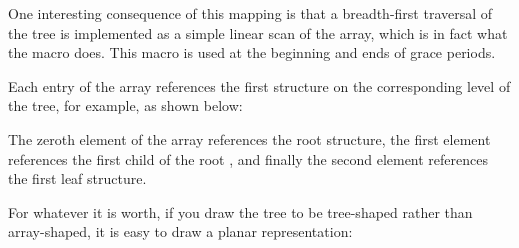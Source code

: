 One interesting consequence of this mapping is that a breadth-first
traversal of the tree is implemented as a simple linear scan of the
array, which is in fact what the 
macro does.
This macro is used at the beginning and ends of grace
periods.

Each entry of the  array references the first 
structure on the corresponding level of the tree, for example, as shown
below:

\begin{center}
\end{center}

The zero{th} element of the array references the root
 structure, the first element references the first child of
the root , and finally the second element references the
first leaf  structure.

For whatever it is worth, if you draw the tree to be tree-shaped rather
than array-shaped, it is easy to draw a planar representation:

\begin{center}
\end{center}

